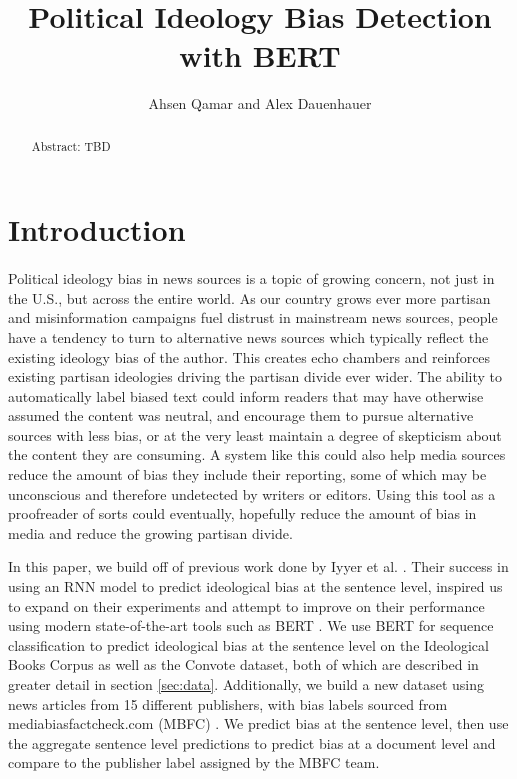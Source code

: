 \documentclass[10pt,a4paper,onecolumn]{article}
\title{Political Ideology Bias Detection with BERT}
\author{Ahsen Qamar and Alex Dauenhauer}
\begin{document}
\maketitle

\begin{abstract}
Abstract: TBD
\end{abstract}

\section{Introduction}
\label{intro}
\paragraph{}
Political ideology bias in news sources is a topic of growing concern, not just in the U.S., but across the entire world. As our country grows ever more partisan and misinformation campaigns fuel distrust in mainstream news sources, people have a tendency to turn to alternative news sources which typically reflect the existing ideology bias of the author. This creates echo chambers and reinforces existing partisan ideologies driving the partisan divide ever wider. The ability to automatically label biased text could inform readers that may have otherwise assumed the content was neutral, and encourage them to pursue alternative sources with less bias, or at the very least maintain a degree of skepticism about the content they are consuming. A system like this could also help media sources reduce the amount of bias they include their reporting, some of which may be unconscious and therefore undetected by writers or editors. Using this tool as a proofreader of sorts could eventually, hopefully reduce the amount of bias in media and reduce the growing partisan divide.

In this paper, we build off of previous work done by Iyyer et al. \cite{iyyerRNN}. Their success in using an RNN model to predict ideological bias at the sentence level, inspired us to expand on their experiments and attempt to improve on their performance using modern state-of-the-art tools such as BERT \cite{bert}. We use BERT for sequence classification to predict ideological bias at the sentence level on the Ideological Books Corpus as well as the Convote dataset, both of which are described in greater detail in section \ref{sec:data}. Additionally, we build a new dataset using news articles from 15 different publishers, with bias labels sourced from mediabiasfactcheck.com (MBFC) \cite{mbfc}. We predict bias at the sentence level, then use the aggregate sentence level predictions to predict bias at a document level and compare to the publisher label assigned by the MBFC team.
\end{document}
